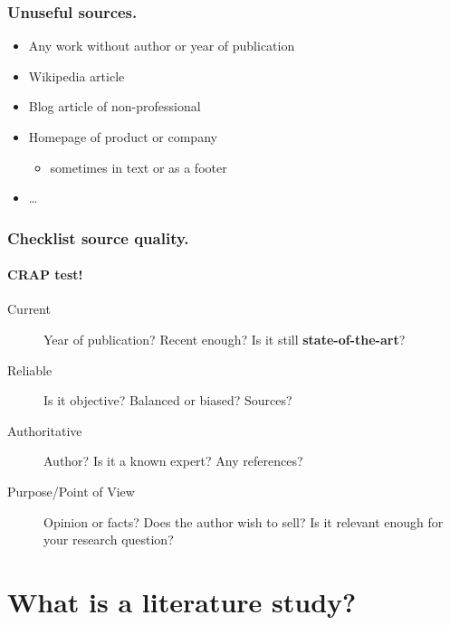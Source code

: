 \documentclass[aspectratio=169]{beamer}
\begin{document}
    \begin{frame}
        \frametitle{Unuseful sources.}
        
        \begin{itemize}
            \item Any work without author or year of publication
            \item Wikipedia article
            \item Blog article of non-professional 
            \item Homepage of product or company 
            \begin{itemize}
                \item sometimes in text or as a footer
            \end{itemize}
            \item \dots
        \end{itemize}
    \end{frame}
    
    \begin{frame}
        \frametitle{Checklist source quality.}
        \framesubtitle{CRAP test!}
        
        \begin{description}
            \item[Current] Year of publication? Recent enough? Is it still \textbf{state-of-the-art}?
            \item[Reliable] Is it objective? Balanced or biased? Sources?
            \item[Authoritative] Author? Is it a known expert? Any references?
            \item[Purpose/Point of View] Opinion or facts? Does the author wish to sell? Is it relevant enough for your research question?
        \end{description}
        
    \end{frame}
    
    
    
    \section{What is a literature study?}
    
\end{document}
